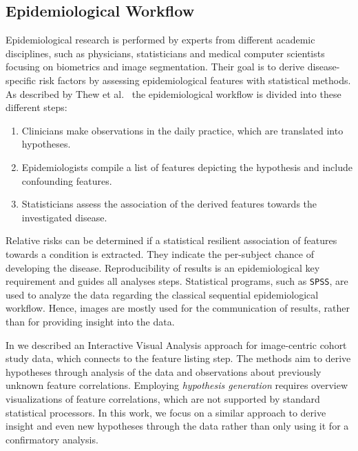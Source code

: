\documentclass[journal]{style/vgtc} 			          %
\begin{document}
\subsection{Epidemiological Workflow} \label{sec:EpidemiologicalWorkflow}
Epidemiological research is performed by experts from different academic disciplines, such as physicians, statisticians and medical computer scientists focusing on biometrics and image segmentation.
Their goal is to derive disease-specific risk factors by assessing epidemiological features with statistical methods.
As described by Thew et al.~\cite{Thew2009} the epidemiological workflow is divided into these different steps:
\begin{enumerate}
	\item Clinicians make observations in the daily practice, which are translated into hypotheses.
	\item Epidemiologists compile a list of features depicting the hypothesis and include confounding features.
	\item Statisticians assess the association of the derived features towards the investigated disease.
\end{enumerate}
Relative risks can be determined if a statistical resilient association of features towards a condition is extracted.
They indicate the per-subject chance of developing the disease.
Reproducibility of results is an epidemiological key requirement and guides all analyses steps.
Statistical programs, such as \texttt{SPSS}, are used to analyze the data regarding the classical sequential epidemiological workflow. Hence, images are mostly used for the communication of results, rather than for providing insight into the data.

In \cite{Klemm2014VIS} we described an Interactive Visual Analysis approach for image-centric cohort study data, which connects to the feature listing step.
The methods aim to derive hypotheses through analysis of the data and observations about previously unknown feature correlations.
Employing \emph{hypothesis generation} requires overview visualizations of feature correlations, which are not supported by standard statistical processors.
In this work, we focus on a similar approach to derive insight and even new hypotheses through the data rather than only using it for a confirmatory analysis.
\end{document}

